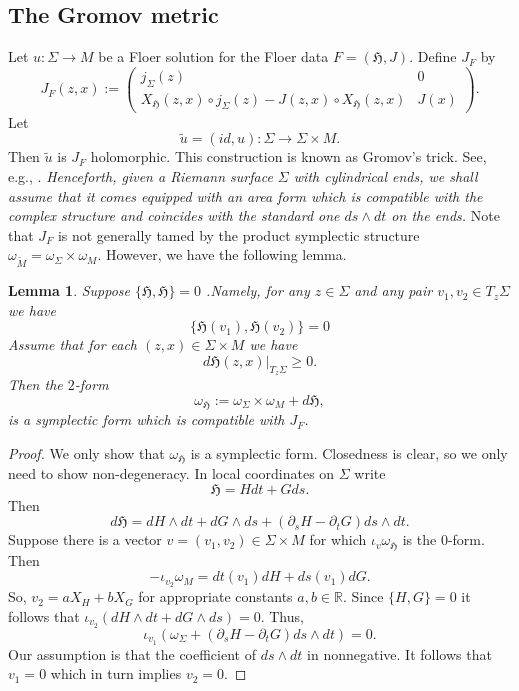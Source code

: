 \documentclass[11pt]{amsart}
\newcommand{\R}{\mathbb{R}}
\newtheorem{lm}[tm]{Lemma}
\theoremstyle{definition}
\theoremstyle{remark}
\begin{document}
\subsection{The Gromov metric}\label{SecGrom}
Let $u:\Sigma\to M$ be a Floer solution for the Floer data $F=(\mathfrak{H},J)$. Define $J_F$ by
\[
J_F(z,x):=\left(\begin{matrix} j_{\Sigma}(z) & 0  \\ X_\mathfrak{H}(z,x)\circ j_\Sigma(z)-J(z,x)\circ X_\mathfrak{H}(z,x) & J(x) \end{matrix}\right).
\]
Let
\[
\tilde{u}=(id,u):\Sigma\to\Sigma\times M.
\]
Then $\tilde{u}$ is $J_F$ holomorphic. This construction is known as Gromov's trick. See, e.g., \cite[Ch. 8.1]{MS2}.
\textit{Henceforth, given a Riemann surface $\Sigma$ with cylindrical ends, we shall assume that it comes equipped with an area form which is compatible with the complex structure and coincides with the standard one $ds\wedge dt$ on the ends.}
Note that $J_F$ is not generally tamed by the product symplectic structure $\omega_{\tilde{M}}=\omega_{\Sigma}\times\omega_M$. However, we have the following lemma.
\begin{lm}\label{lmAssocSymp}
 Suppose $\{\mathfrak{H},\mathfrak{H}\}=0$ .Namely,  for any $z\in\Sigma$ and any pair $v_1,v_2\in T_z\Sigma$ we have
 \begin{equation}\label{EqPoisson}
 \{\mathfrak{H}(v_1),\mathfrak{H}(v_2)\}=0
 \end{equation}
Assume that for each $(z,x)\in\Sigma\times M$ we have
\begin{equation}\label{EqMonHom}
d\mathfrak{H}(z,x)|_{T_z\Sigma}\geq 0.
\end{equation}
Then the $2$-form
\[
\omega_\mathfrak{H}:=\omega_\Sigma\times\omega_M+d\mathfrak{H},
\]
is a symplectic form which is compatible with $J_F$.
\end{lm}
\begin{proof}
We only show that $\omega_\mathfrak{H}$ is a symplectic form. Closedness is clear, so we only need to show non-degeneracy. In local coordinates on $\Sigma$ write
\[
\mathfrak{H}=Hdt+Gds.
\]
Then
\[
d\mathfrak{H}=dH\wedge dt+dG\wedge ds +(\partial_sH-\partial_tG)ds\wedge dt.
\]
Suppose there is a vector $v=(v_1,v_2)\in \Sigma\times M$ for which $\iota_v\omega_\mathfrak{H}$ is the $0$-form. Then
\[
-\iota_{v_2}\omega_M=dt(v_1)dH+ds(v_1)dG.
\]
So, $v_2=aX_H+bX_G$ for appropriate constants $a,b\in\R.$ Since $\{H,G\}=0$ it follows that $\iota_{v_2}(dH\wedge dt+dG\wedge ds)=0$. Thus,
\[
\iota_{v_1}(\omega_\Sigma+(\partial_sH-\partial_tG)ds\wedge dt)=0.
\]
Our assumption is that the coefficient of $ds\wedge dt$ in nonnegative. It follows that $v_1=0$ which in turn implies $v_2=0$.
\end{proof}
\end{document}
